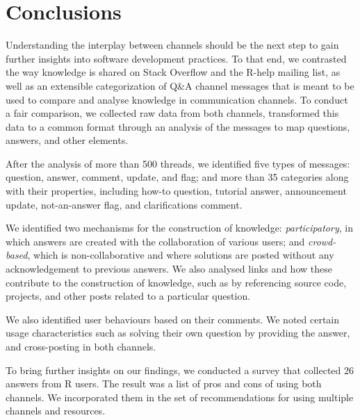 \section{Conclusions}
\label{cha:conclusion}


    Understanding the interplay between channels should be the next step to gain further insights into software development practices.
    To that end, we contrasted the way knowledge is shared on Stack Overflow and the R-help mailing list, as well as an extensible categorization of Q\&A channel messages that is meant to be used to compare and analyse knowledge in communication channels.
    To conduct a fair comparison, we collected raw data from both channels, transformed this data to a common format through an analysis of the messages to map questions, answers, and other elements.

    After the analysis of more than 500 threads, we identified five types of messages: question, answer, comment, update, and flag; and more than 35 categories along with their properties, including how-to question, tutorial answer, announcement update, not-an-answer flag, and clarifications comment.

    We identified two mechanisms for the construction of knowledge: \emph{participatory}, in which answers are created with the collaboration of various users; and \emph{crowd-based}, which is non-collaborative and where solutions are posted without any acknowledgement to previous answers.
    We also analysed links and how these contribute to the construction of knowledge, such as by referencing source code, projects, and other posts related to a particular question.

    We also identified user behaviours based on their comments.
    We noted certain usage characteristics such as solving their own question by providing the answer, and cross-posting in both channels.

    To bring further insights on our findings, we conducted a survey that collected 26 answers from R users.
    The result was a list of pros and cons of using both channels. We incorporated them in the set of recommendations for using multiple channels and resources.

